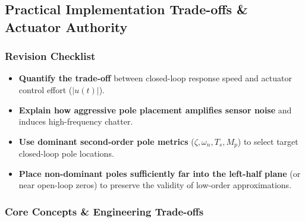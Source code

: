 \documentclass[12pt,onecolumn,twoside ]{article}
\begin{document}
	\subsection{Practical Implementation Trade-offs \& Actuator Authority}
	\subsubsection{Revision Checklist}
	\begin{itemize}
		\item[$\square$]
		\textbf{Quantify the trade-off} between closed-loop response speed and actuator control effort ($|u(t)|$).
		\item[$\square$]
		\textbf{Explain how aggressive pole placement amplifies sensor noise} and induces high-frequency chatter.
		\item[$\square$]
		\textbf{Use dominant second-order pole metrics} ($\zeta, \omega_n, T_s, M_p$) to select target closed-loop pole locations.
		\item[$\square$]
		\textbf{Place non-dominant poles sufficiently far into the left-half plane} (or near open-loop zeros) to preserve the validity of low-order approximations.
	\end{itemize}
	
	\subsubsection{Core Concepts \& Engineering Trade-offs}
\end{document}
